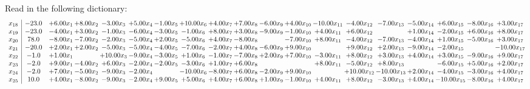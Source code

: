 \documentclass[9pt]{article}
\begin{document}
Read in the following dictionary:
\[\begin{array}{c| c c@{\hskip 2pt} c@{\hskip 2pt} c@{\hskip 2pt} c@{\hskip 2pt} c@{\hskip 2pt} c@{\hskip 2pt} c@{\hskip 2pt} c@{\hskip 2pt} c@{\hskip 2pt} c@{\hskip 2pt} c@{\hskip 2pt} c@{\hskip 2pt} c@{\hskip 2pt} c@{\hskip 2pt} c@{\hskip 2pt} c@{\hskip 2pt} c@{\hskip 2pt} }
 x_{18}   &  -23.0 & +  6.00 x_{1} & +  8.00 x_{2} & -3.00 x_{3} & +  5.00 x_{4} & -1.00 x_{5} & + 10.00 x_{6} & +  4.00 x_{7} & +  7.00 x_{8} & -6.00 x_{9} & +  4.00 x_{10} & -10.00 x_{11} & -4.00 x_{12} & -7.00 x_{13} & -5.00 x_{14} & +  6.00 x_{15} & -8.00 x_{16} & +  3.00 x_{17}\\
 x_{19}   &  -23.0 & -4.00 x_{1} & +  3.00 x_{2} & -1.00 x_{3} & -6.00 x_{4} & -3.00 x_{5} & -1.00 x_{6} & +  8.00 x_{7} & +  3.00 x_{8} & -9.00 x_{9} & -1.00 x_{10} & +  4.00 x_{11} & +  6.00 x_{12} &   & +  1.00 x_{14} & -2.00 x_{15} & +  6.00 x_{16} & +  8.00 x_{17}\\
 x_{20}   &  78.0 & -8.00 x_{1} & -7.00 x_{2} & -2.00 x_{3} & -5.00 x_{4} & +  2.00 x_{5} & -5.00 x_{6} & +  4.00 x_{7} & -8.00 x_{8} &   & -7.00 x_{10} & +  8.00 x_{11} & -4.00 x_{12} & -7.00 x_{13} & -4.00 x_{14} & +  1.00 x_{15} & -5.00 x_{16} & +  3.00 x_{17}\\
 x_{21}   &  -20.0 & +  2.00 x_{1} & +  2.00 x_{2} & -5.00 x_{3} & -5.00 x_{4} & -4.00 x_{5} & -7.00 x_{6} & -2.00 x_{7} & +  4.00 x_{8} & -6.00 x_{9} & +  9.00 x_{10} &   & +  9.00 x_{12} & +  2.00 x_{13} & -9.00 x_{14} & -2.00 x_{15} &   & -10.00 x_{17}\\
 x_{22}   &  -1.0 & +  1.00 x_{1} &   & + 10.00 x_{3} & -9.00 x_{4} & -3.00 x_{5} & +  1.00 x_{6} & -1.00 x_{7} & -7.00 x_{8} & +  2.00 x_{9} & +  7.00 x_{10} & -3.00 x_{11} & +  8.00 x_{12} & +  3.00 x_{13} & +  4.00 x_{14} & +  3.00 x_{15} & -9.00 x_{16} & +  9.00 x_{17}\\
 x_{23}   &  -2.0 & +  9.00 x_{1} & -4.00 x_{2} & +  6.00 x_{3} & -2.00 x_{4} & -2.00 x_{5} & -3.00 x_{6} & +  1.00 x_{7} & +  6.00 x_{8} &    &   & +  8.00 x_{11} & -5.00 x_{12} & +  8.00 x_{13} &   & -6.00 x_{15} & +  5.00 x_{16} & +  2.00 x_{17}\\
 x_{24}   &  -2.0 & +  7.00 x_{1} & -5.00 x_{2} & -9.00 x_{3} & -2.00 x_{4} &   & -10.00 x_{6} & -8.00 x_{7} & +  6.00 x_{8} & -2.00 x_{9} & +  9.00 x_{10} &   & + 10.00 x_{12} & -10.00 x_{13} & +  2.00 x_{14} & -4.00 x_{15} & -3.00 x_{16} & +  4.00 x_{17}\\
 x_{25}   &  10.0 & +  4.00 x_{1} & -8.00 x_{2} & -9.00 x_{3} & -2.00 x_{4} & +  9.00 x_{5} & +  5.00 x_{6} & +  4.00 x_{7} & +  6.00 x_{8} & +  1.00 x_{9} & -1.00 x_{10} & +  4.00 x_{11} & +  8.00 x_{12} & -3.00 x_{13} & +  4.00 x_{14} & -10.00 x_{15} & -8.00 x_{16} & +  4.00 x_{17}\\

\end{array}\]
\end{document}
